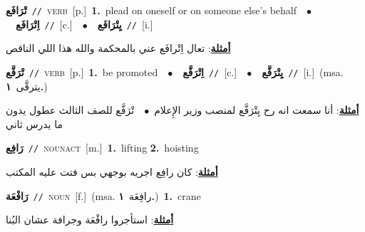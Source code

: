 \documentclass[10pt,a4paper,twoside]{article} %
\begin{document}
\begin{multicols}{2}
{\setlength\topsep{0pt}\textbf{\foreignlanguage{arabic}{تْرَافَع}}\ {\color{gray}\texttt{//}\color{black}}\ \textsc{verb}\ [p.]\ \textbf{1.}~plead on oneself or on someone else's behalf\ \ $\bullet$\ \ \setlength\topsep{0pt}\textbf{\foreignlanguage{arabic}{اِتْرَافَع}}\ {\color{gray}\texttt{//}\color{black}}\ [c.]\ \ $\bullet$\ \ \setlength\topsep{0pt}\textbf{\foreignlanguage{arabic}{يِتْرَافَع}}\ {\color{gray}\texttt{//}\color{black}}\ [i.]\  \begin{flushright}\color{gray}\foreignlanguage{arabic}{\textbf{\underline{\foreignlanguage{arabic}{أمثلة}}}: تعال اِتْرافَع عني بالمحكمة والله هذا اللي الناقص}\end{flushright}\color{black}} \vspace{2mm}

{\setlength\topsep{0pt}\textbf{\foreignlanguage{arabic}{تْرَفَّع}}\ {\color{gray}\texttt{//}\color{black}}\ \textsc{verb}\ [p.]\ \textbf{1.}~be promoted\ \ $\bullet$\ \ \setlength\topsep{0pt}\textbf{\foreignlanguage{arabic}{اِتْرَفَّع}}\ {\color{gray}\texttt{//}\color{black}}\ [c.]\ \ $\bullet$\ \ \setlength\topsep{0pt}\textbf{\foreignlanguage{arabic}{يِتْرَفَّع}}\ {\color{gray}\texttt{//}\color{black}}\ [i.]\ \color{gray}(msa. \foreignlanguage{arabic}{يترقَّى}~\foreignlanguage{arabic}{\textbf{١.}})\color{black}\  \begin{flushright}\color{gray}\foreignlanguage{arabic}{\textbf{\underline{\foreignlanguage{arabic}{أمثلة}}}: أنا سمعت انه رح يِتْرَفَّع لمنصب وزير الإِعلام\ $\bullet$\ \  تْرَفَّع للصف الثالث عطول يدون ما يدرس ثاني}\end{flushright}\color{black}} \vspace{2mm}

{\setlength\topsep{0pt}\textbf{\foreignlanguage{arabic}{رَافِع}}\ {\color{gray}\texttt{//}\color{black}}\ \textsc{noun\textunderscore act}\ [m.]\ \textbf{1.}~lifting  \textbf{2.}~hoisting\  \begin{flushright}\color{gray}\foreignlanguage{arabic}{\textbf{\underline{\foreignlanguage{arabic}{أمثلة}}}: كان رافِع اجريه بوجهي بس فتت عليه المكتب}\end{flushright}\color{black}} \vspace{2mm}

{\setlength\topsep{0pt}\textbf{\foreignlanguage{arabic}{رَافْعَة}}\ {\color{gray}\texttt{//}\color{black}}\ \textsc{noun}\ [f.]\ \color{gray}(msa. \foreignlanguage{arabic}{رافِعَة}~\foreignlanguage{arabic}{\textbf{١.}})\color{black}\ \textbf{1.}~crane\  \begin{flushright}\color{gray}\foreignlanguage{arabic}{\textbf{\underline{\foreignlanguage{arabic}{أمثلة}}}: استأجروا رافْعَة وجرافة عشان البُنا}\end{flushright}\color{black}} \vspace{2mm}


\end{multicols}
\end{document}
